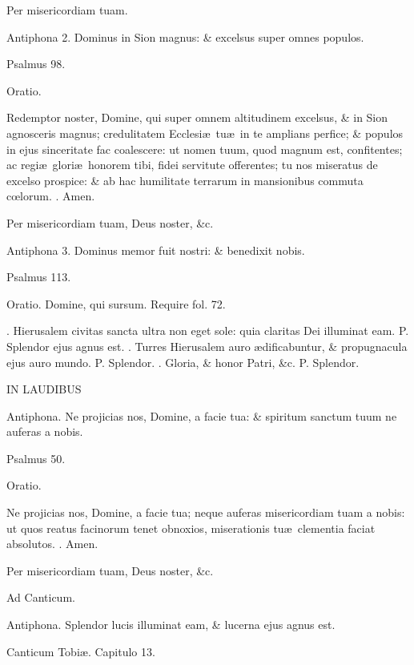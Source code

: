 \documentclass[letter,11pt]{book}
\makeatletter
\DeclareRobustCommand{\Vbar}{\vers@resp{-0.1em}{V}}
\DeclareRobustCommand{\Rbar}{\vers@resp{0pt}{R}}
\newcommand{\vers@resp@sym}{\raisebox{0.2ex}{\rotatebox[origin=c]{-20}{$\m@th\rceil$}}}
\newcommand{\vers@resp}[2]{%
  {\ooalign{\hidewidth\kern#1\vers@resp@sym\hidewidth\cr#2\cr}}%
}%
\def\P{\color{Red} P. \color{black}}
\def\V{\color{Red} \Vbar . \color{black}}
\def\R{\color{Red} \Rbar . \color{black}}
\makeatother
\begin{document}
\begin{multicols*}{2}
Per misericordiam tuam.

Antiphona 2. Dominus in Sion magnus: \& excelsus super omnes populos.

Psalmus 98.

Oratio.

Redemptor noster, Domine, qui super omnem altitudinem excelsus, \& in Sion agnosceris magnus; credulitatem Ecclesi\ae \ tu\ae \ in te amplians perfice; \& populos in ejus sinceritate fac coalescere: ut nomen tuum, quod magnum est, confitentes; ac regi\ae \ glori\ae \ honorem tibi, fidei servitute offerentes; tu nos miseratus de excelso prospice: \& ab hac humilitate terrarum in mansionibus commuta c\oe lorum.
\R Amen.

Per misericordiam tuam, Deus noster, \&c.

Antiphona 3. Dominus memor fuit nostri: \& benedixit nobis.

Psalmus 113.

Oratio. Domine, qui sursum. Require fol. 72.

\R Hierusalem civitas sancta ultra non eget sole: quia claritas Dei illuminat eam. \P Splendor ejus agnus est. \V Turres Hierusalem auro \ae dificabuntur, \& propugnacula ejus auro mundo. \P Splendor. \V Gloria, \& honor Patri, \&c. \P Splendor.

IN LAUDIBUS

Antiphona. Ne projicias nos, Domine, a facie tua: \& spiritum sanctum tuum ne auferas a nobis.

Psalmus 50.

Oratio.

Ne projicias nos, Domine, a facie tua; neque auferas misericordiam tuam a nobis: ut quos reatus facinorum tenet obnoxios, miserationis tu\ae \ clementia faciat absolutos.
\R Amen.

Per misericordiam tuam, Deus noster, \&c.

Ad Canticum.

Antiphona. Splendor lucis illuminat eam, \& lucerna ejus agnus est.

Canticum Tobi\ae . Capitulo 13.


\end{multicols*}
\end{document}
